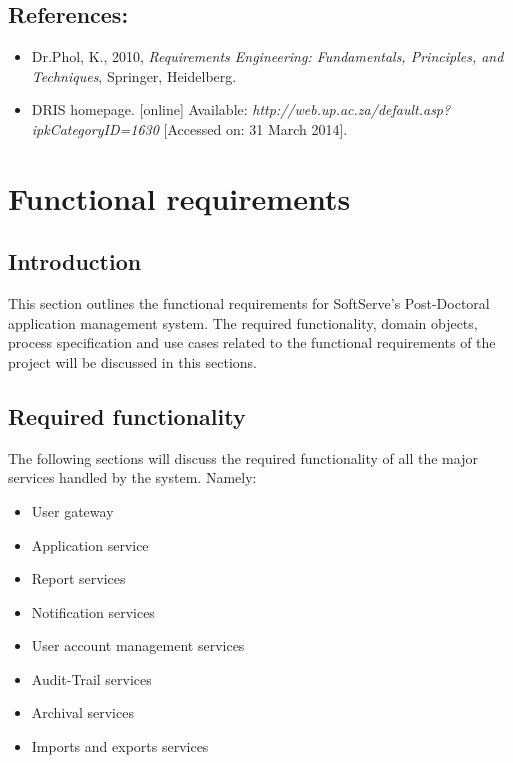 \documentclass[12pt]{article}
\begin{document}
\vspace{0.2in}

\subsection{References:}
\vspace{0.1in}
\begin{itemize}
\item Dr.Phol, K., 2010, \textit{Requirements Engineering: Fundamentals, Principles, and Techniques}, Springer, Heidelberg.
\item DRIS homepage. [online] Available: \textit{http://web.up.ac.za/default.asp?ipkCategoryID=1630} [Accessed on: 31 March 2014].
\end{itemize}	

\vspace{0.5in}

\newpage
\section{Functional requirements}
\subsection{Introduction} %
\vspace{0.2in}
This section outlines the functional requirements for SoftServe's Post-Doctoral application management system.
The required functionality, domain objects, process specification and use cases related to the functional requirements of the project will be discussed in this sections.
\vspace{0.2in}

\subsection{Required functionality} %
\vspace{0.2in}
The following sections will discuss the required functionality of all the major services handled by the system. Namely:
\begin{itemize}
\item User gateway
\item Application service
\item Report services
\item Notification services
\item User account management services
\item Audit-Trail services
\item Archival services
\item Imports and exports services
\end{itemize}
\end{document}

